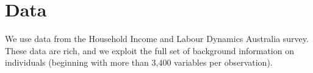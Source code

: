 \documentclass[12pt, a4paper]{article}
\begin{document}
%
%
%
%

\section{Data}

We use data from the Household Income and Labour Dynamics Australia survey. These data are rich, and we exploit the full set of background information on individuals (beginning with more than 3,400 variables per observation).
\end{document}
